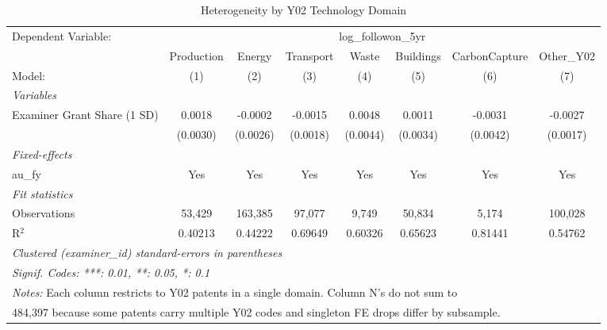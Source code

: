 
\begin{table}[htbp]
   \caption{\label{tab:hetero} Heterogeneity by Y02 Technology Domain}
   \centering
   \begin{adjustbox}{max width=\textwidth}
   \begin{tabular}{lccccccc}
      \tabularnewline \midrule \midrule
      Dependent Variable: & \multicolumn{7}{c}{log\_followon\_5yr}\\
                               & Production & Energy   & Transport & Waste    & Buildings & CarbonCapture & Other\_Y02 \\    
      Model:                   & (1)        & (2)      & (3)       & (4)      & (5)       & (6)           & (7)\\  
      \midrule
      \emph{Variables}\\
      Examiner Grant Share (1 SD) & 0.0018     & -0.0002  & -0.0015   & 0.0048   & 0.0011    & -0.0031       & -0.0027\\   
                               & (0.0030)   & (0.0026) & (0.0018)  & (0.0044) & (0.0034)  & (0.0042)      & (0.0017)\\   
      \midrule
      \emph{Fixed-effects}\\
      au\_fy                   & Yes        & Yes      & Yes       & Yes      & Yes       & Yes           & Yes\\  
      \midrule
      \emph{Fit statistics}\\
      Observations             & 53,429     & 163,385  & 97,077    & 9,749    & 50,834    & 5,174         & 100,028\\  
      R$^2$                    & 0.40213    & 0.44222  & 0.69649   & 0.60326  & 0.65623   & 0.81441       & 0.54762\\  
      \midrule \midrule
      \multicolumn{8}{l}{\emph{Clustered (examiner\_id) standard-errors in parentheses}}\\
      \multicolumn{8}{l}{\emph{Signif. Codes: ***: 0.01, **: 0.05, *: 0.1}}\\
      \multicolumn{8}{l}{\footnotesize\emph{Notes:} Each column restricts to Y02 patents in a single domain. Column N's do not sum to}\\
      \multicolumn{8}{l}{\footnotesize 484,397 because some patents carry multiple Y02 codes and singleton FE drops differ by subsample.}\\
   \end{tabular}
   \end{adjustbox}
\end{table}


